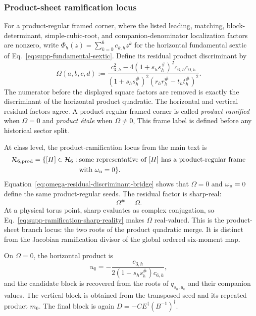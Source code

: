\subsubsection{{Product-sheet ramification locus}}
\label{sec:supp-product-ramification}

For a product-regular framed corner, where the listed leading, matching, block-determinant, simple-cubic-root, and companion-denominator localization factors are nonzero, write $\Phi_h(z)=\sum_{k=0}^6c_{k,h}z^k$ for the horizontal fundamental sextic of Eq.~\eqref{eq:supp-fundamental-sextic}. Define its residual product discriminant by
\begin{equation}
\Omega(a,b,c,d):=
\frac{c_{3,h}^2-4(1+s_hs_h^\#)^2c_{6,h}c_{0,h}}
{(1+s_hs_h^\#)^2(r_hr_h^\#-t_ht_h^\#)^2}.
\label{eq:supp-ramification-factorization}
\end{equation}
The numerator before the displayed square factors are removed is exactly the discriminant of the horizontal product quadratic. The horizontal and vertical residual factors agree. A product-regular framed corner is called \emph{product ramified} when $\Omega=0$ and \emph{product \'etale} when $\Omega\ne0$, This frame label is defined before any historical sector split.

At class level, the product-ramification locus from the main text is
\begin{equation}
\begin{aligned}
\mathcal R_{6,\mathrm{prod}}=\{[H]\in\mathcal H_6:\;&\text{some representative of $[H]$ has a product-regular frame}\\
&\text{with $\omega_{\rm n}=0$}\}.
\end{aligned}
\label{eq:supp-product-branch-class-locus}
\end{equation}
{Equation~\eqref{eq:omega-residual-discriminant-bridge} shows that $\Omega=0$ and $\omega_{\rm n}=0$ define the same product-regular seeds. The residual factor is sharp-real:}
\begin{equation}
\Omega^\#=\Omega.
\label{eq:supp-ramification-sharp-reality}
\end{equation}
At a physical torus point, sharp evaluates as complex conjugation, so Eq.~\eqref{eq:supp-ramification-sharp-reality} makes $\Omega$ real-valued. This is the product-sheet branch locus: the two roots of the product quadratic merge.  It is distinct from the Jacobian ramification divisor of the global ordered six-moment map.

On $\Omega=0$, the horizontal product is
\begin{equation}
u_0=-\frac{c_{3,h}}{2(1+s_hs_h^\#)c_{6,h}},
\label{eq:supp-ramification-u0}
\end{equation}
and the candidate block is recovered from the roots of $q_{s_h,u_0}$ and their companion values.  The vertical block is obtained from the transposed seed and its repeated product $m_0$. The final block is again $D=-CE^\dagger(B^{-1})^\dagger$.

